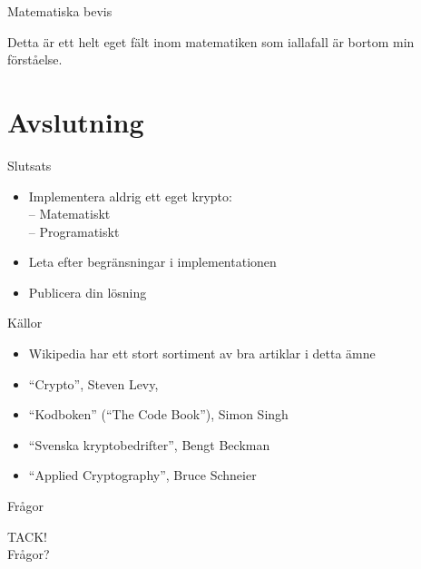 \documentclass{beamer}
\begin{document}
\begin{frame}{Matematiska bevis}
\begin{center}
\pause
Detta är ett helt eget fält inom matematiken som iallafall är bortom min förståelse.
\end{center}
\end{frame}



\section{Avslutning}

\begin{frame}{Slutsats}
\begin{itemize}
\item Implementera aldrig ett eget krypto: \\
\pause  -- Matematiskt \\
\pause  -- Programatiskt
\pause \item Leta efter begränsningar i implementationen
\pause \item Publicera din lösning
\end{itemize}
\end{frame}


\begin{frame}{Källor}
\begin{itemize}
\item Wikipedia har ett stort sortiment av bra artiklar i detta ämne
\pause \item ``Crypto'', Steven Levy,
\pause \item ``Kodboken'' (``The Code Book''), Simon Singh
\pause \item ``Svenska kryptobedrifter'', Bengt Beckman
\pause \item ``Applied Cryptography'', Bruce Schneier
\end{itemize}
\end{frame}

\begin{frame}{Frågor}
\begin{center}
TACK!\\
Frågor?
\end{center}
\end{frame}


\end{document}
